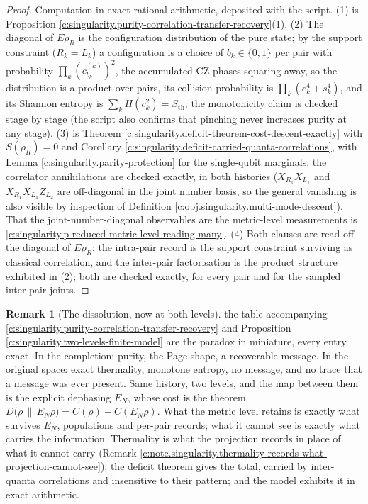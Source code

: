 \documentclass[11pt]{article}
\theoremstyle{definition}
\newtheorem{remark}[theorem]{Remark}
\theoremstyle{plain}
\providecommand{\EN}{}\renewcommand{\EN}{E_{N}}
\providecommand{\Sth}{}\renewcommand{\Sth}{S_{\mathrm{th}}}
\providecommand{\rel}{}\renewcommand{\rel}[2]{D\bigl(#1 \,\|\, #2\bigr)}
\begin{document}
\begin{proof}
Computation in exact rational arithmetic, deposited with the script. (1) is Proposition \ref{c:singularity.purity-correlation-transfer-recovery}(1). (2) The diagonal of $E\rho_R$ is the configuration distribution of the pure state; by the support constraint ($R_k = L_k$) a configuration is a choice of $b_k \in \{0,1\}$ per pair with probability $\prod_k (c^{(k)}_{b_k})^2$, the accumulated CZ phases squaring away, so the distribution is a product over pairs, its collision probability is $\prod_k (c_k^4 + s_k^4)$, and its Shannon entropy is $\sum_k H(c_k^2) = \Sth$; the monotonicity claim is checked stage by stage (the script also confirms that pinching never increases purity at any stage). (3) is Theorem \ref{c:singularity.deficit-theorem-cost-descent-exactly} with $S(\rho_R) = 0$ and Corollary \ref{c:singularity.deficit-carried-quanta-correlations}, with Lemma \ref{c:singularity.parity-protection} for the single-qubit marginals; the correlator annihilations are checked exactly, in both histories ($X_{R_1}X_{L_1}$ and $X_{R_1}X_{L_1}Z_{L_2}$ are off-diagonal in the joint number basis, so the general vanishing is also visible by inspection of Definition \ref{c:obj.singularity.multi-mode-descent}). That the joint-number-diagonal observables are the metric-level measurements is \ref{c:singularity.p-reduced-metric-level-reading-many}. (4) Both clauses are read off the diagonal of $E\rho_R$: the intra-pair record is the support constraint surviving as classical correlation, and the inter-pair factorisation is the product structure exhibited in (2); both are checked exactly, for every pair and for the sampled inter-pair joints.

\end{proof}

\begin{remark}[The dissolution, now at both levels]\label{c:note.singularity.dissolution-now-both-levels}
the table accompanying \ref{c:singularity.purity-correlation-transfer-recovery} and Proposition \ref{c:singularity.two-levels-finite-model} are the paradox in miniature, every entry exact. In the completion: purity, the Page shape, a recoverable message. In the original space: exact thermality, monotone entropy, no message, and no trace that a message was ever present. Same history, two levels, and the map between them is the explicit dephasing $\EN$, whose cost is the theorem $\rel{\rho}{\EN\rho} = C(\rho) - C(\EN\rho)$. What the metric level retains is exactly what survives $\EN$, populations and per-pair records; what it cannot see is exactly what carries the information. Thermality is what the projection records in place of what it cannot carry (Remark \ref{c:note.singularity.thermality-records-what-projection-cannot-see}); the deficit theorem gives the total, carried by inter-quanta correlations and insensitive to their pattern; and the model exhibits it in exact arithmetic.
\end{remark}
\end{document}
